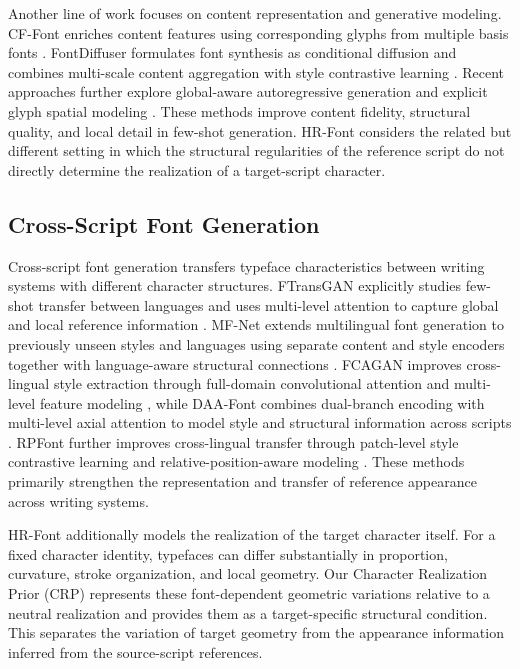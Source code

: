 \documentclass{article}
\begin{document}
Another line of work focuses on content representation and generative modeling.
CF-Font enriches content features using corresponding glyphs from multiple basis fonts
\citep{wang2023cffont}.
FontDiffuser formulates font synthesis as conditional diffusion and combines multi-scale content aggregation with style contrastive learning
\citep{yang2024fontdiffuser}.
Recent approaches further explore global-aware autoregressive generation and explicit glyph spatial modeling
\citep{cai2026garfont,su2026glyphspatialnet}.
These methods improve content fidelity, structural quality, and local detail in few-shot generation.
HR-Font considers the related but different setting in which the structural regularities of the reference script do not directly determine the realization of a target-script character.

\subsection{Cross-Script Font Generation}

Cross-script font generation transfers typeface characteristics between writing systems with different character structures.
FTransGAN explicitly studies few-shot transfer between languages and uses multi-level attention to capture global and local reference information
\citep{li2021ftransgan}.
MF-Net extends multilingual font generation to previously unseen styles and languages using separate content and style encoders together with language-aware structural connections
\citep{zhang2022mfnet}.
FCAGAN improves cross-lingual style extraction through full-domain convolutional attention and multi-level feature modeling
\citep{zhao2024fcagan},
while DAA-Font combines dual-branch encoding with multi-level axial attention to model style and structural information across scripts
\citep{yan2026daafont}.
RPFont further improves cross-lingual transfer through patch-level style contrastive learning and relative-position-aware modeling
\citep{zeng2026rpfont}.
These methods primarily strengthen the representation and transfer of reference appearance across writing systems.

HR-Font additionally models the realization of the target character itself.
For a fixed character identity, typefaces can differ substantially in proportion, curvature, stroke organization, and local geometry.
Our Character Realization Prior (CRP) represents these font-dependent geometric variations relative to a neutral realization and provides them as a target-specific structural condition.
This separates the variation of target geometry from the appearance information inferred from the source-script references.
\end{document}
